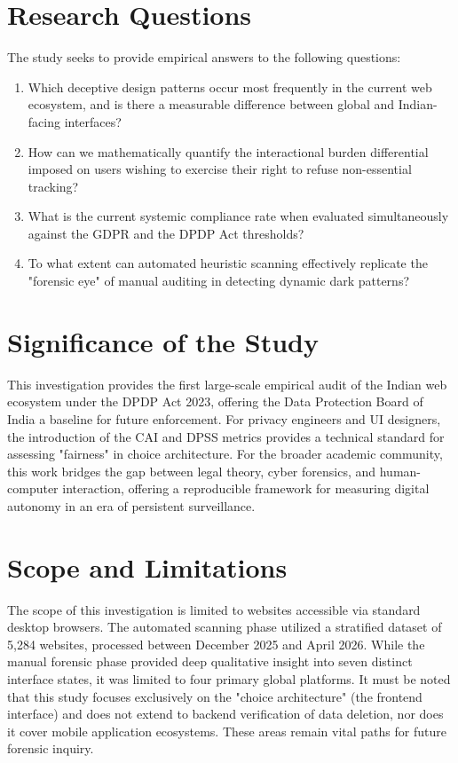 \documentclass[12pt,a4paper]{report}
\begin{document}
\section{Research Questions}

The study seeks to provide empirical answers to the following questions:

\begin{enumerate}[leftmargin=1.5cm]
\item Which deceptive design patterns occur most frequently in the current web ecosystem, and is there a measurable difference between global and Indian-facing interfaces?
\item How can we mathematically quantify the interactional burden differential imposed on users wishing to exercise their right to refuse non-essential tracking?
\item What is the current systemic compliance rate when evaluated simultaneously against the GDPR and the DPDP Act thresholds?
\item To what extent can automated heuristic scanning effectively replicate the "forensic eye" of manual auditing in detecting dynamic dark patterns?
\end{enumerate}

\section{Significance of the Study}

This investigation provides the first large-scale empirical audit of the Indian web ecosystem under the DPDP Act 2023, offering the Data Protection Board of India a baseline for future enforcement. For privacy engineers and UI designers, the introduction of the CAI and DPSS metrics provides a technical standard for assessing "fairness" in choice architecture. For the broader academic community, this work bridges the gap between legal theory, cyber forensics, and human-computer interaction, offering a reproducible framework for measuring digital autonomy in an era of persistent surveillance.

\section{Scope and Limitations}

The scope of this investigation is limited to websites accessible via standard desktop browsers. The automated scanning phase utilized a stratified dataset of 5,284 websites, processed between December 2025 and April 2026. While the manual forensic phase provided deep qualitative insight into seven distinct interface states, it was limited to four primary global platforms. It must be noted that this study focuses exclusively on the "choice architecture" (the frontend interface) and does not extend to backend verification of data deletion, nor does it cover mobile application ecosystems. These areas remain vital paths for future forensic inquiry.
\end{document}
